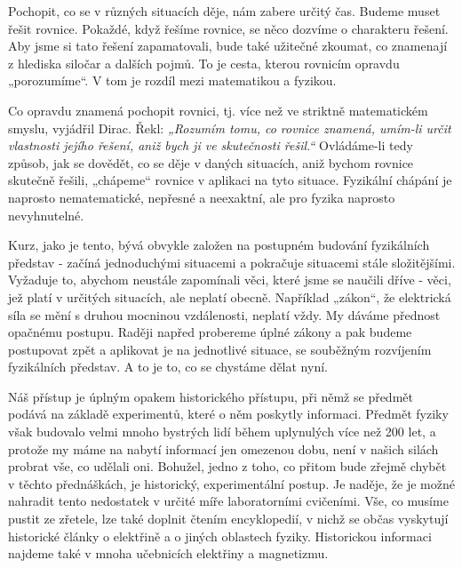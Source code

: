     Pochopit, co se v různých situacích děje, nám zabere určitý čas. Budeme muset řešit rovnice.
    Pokaždé, když řešíme rovnice, se něco dozvíme o charakteru řešení. Aby jsme si tato řešení
    zapamatovali, bude také užitečné zkoumat, co znamenají z hlediska siločar a dalších pojmů. To je
    cesta, kterou rovnicím opravdu „porozumíme“. V tom je rozdíl mezi matematikou a fyzikou. 
    
    Co opravdu znamená pochopit rovnici, tj. více než ve stri\-ktně matematickém smyslu, vyjádřil
    Dirac. Řekl: \emph{„Rozumím tomu, co rovnice znamená, umím-li určit vlastnosti jejího řešení,
    aniž bych ji ve skutečnosti řešil.“} Ovládáme-li tedy způsob, jak se dovědět, co se děje v
    daných  situacích, aniž bychom rovnice skutečně řešili, „chápeme“ rovnice v aplikaci na tyto
    situace. Fyzikální chápání je naprosto nematematické, nepřesné a neexaktní, ale pro fyzika
    naprosto nevyhnutelné.
    
    Kurz, jako je tento, bývá obvykle založen na postupném budování fyzikálních představ - začíná
    jednoduchými situacemi a pokračuje situacemi stále složitějšími. Vyžaduje to, abychom neustále
    zapomínali věci, které jsme se naučili dříve - věci, jež platí v určitých situacích, ale neplatí
    obecně. Například „zákon“, že elektrická síla se mění s druhou mocninou vzdálenosti, neplatí
    vždy. My dáváme přednost opačnému postupu. Raději napřed probereme úplné zákony a pak budeme
    postupovat zpět a aplikovat je na jednotlivé situace, se souběžným rozvíjením fyzikálních
    představ. A to je to, co se chystáme dělat nyní.

    
    Náš přístup je úplným opakem historického přístupu, při němž se předmět podává na základě
    experimentů, které o něm poskytly informaci. Předmět fyziky však budovalo velmi mnoho bystrých
    lidí během uplynulých více než 200 let, a protože my máme na nabytí informací jen omezenou dobu,
    není v našich silách probrat vše, co udělali oni. Bohužel, jedno z toho, co přitom bude zřejmě
    chybět v těchto přednáškách, je historický, experimentální postup. Je naděje, že je možné
    nahradit tento nedostatek v určité míře laboratorními cvičeními. Vše, co musíme pustit ze
    zřetele, lze také doplnit čtením encyklopedií, v nichž se občas vyskytují historické články o
    elektřině a o jiných oblastech fyziky. Historickou informaci najdeme také v mnoha učebnicích
    elektřiny a magnetizmu.
      
